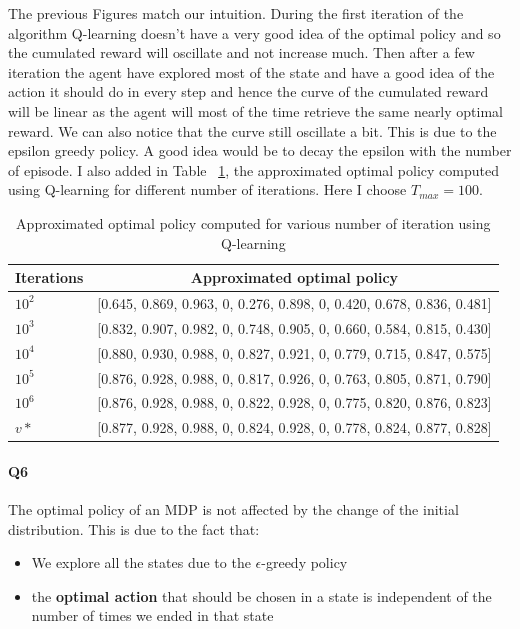 \documentclass[11pt]{article}
\numberwithin{figure}{section} %
\begin{document}
The previous Figures match our intuition. During the first iteration of the algorithm Q-learning doesn't have a very good idea of the optimal policy and so the cumulated reward will oscillate and not increase much. Then after a few iteration the agent have explored most of the state and have a good idea of the action it should do in every step and hence the curve of the cumulated reward will be linear as the agent will most of the time retrieve the same nearly optimal reward. We can also notice that the curve still oscillate a bit. This is due to the epsilon greedy policy. A good idea would be to decay the epsilon with the number of episode. I also added in Table ~\ref{table:Q_learning_table}, the approximated optimal policy computed using Q-learning for different number of iterations. Here I choose $T_{max} = 100$.

\begin{table}[H]
\centering
\begin{tabular}{|l|l|}
\toprule
\textbf{Iterations}  & \multicolumn{1}{c|}{\textbf{Approximated optimal policy}}                  \\ \midrule
$10^2$ & {[}0.645, 0.869, 0.963, 0, 0.276, 0.898, 0, 0.420, 0.678, 0.836, 0.481{]} \\
$10^3$ & {[}0.832, 0.907, 0.982, 0, 0.748, 0.905, 0, 0.660, 0.584, 0.815, 0.430{]} \\
$10^4$ & {[}0.880, 0.930, 0.988, 0, 0.827, 0.921, 0, 0.779, 0.715, 0.847, 0.575{]} \\
$10^5$ & {[}0.876, 0.928, 0.988, 0, 0.817, 0.926, 0, 0.763, 0.805, 0.871, 0.790{]} \\
$10^6$ & {[}0.876, 0.928, 0.988, 0, 0.822, 0.928, 0, 0.775, 0.820, 0.876, 0.823{]} \\ \midrule
$v*$                   & {[}0.877, 0.928, 0.988, 0, 0.824, 0.928, 0, 0.778, 0.824, 0.877, 0.828{]}  \\ \bottomrule
\end{tabular}
\caption{Approximated optimal policy computed for various number of iteration using Q-learning}
\label{table:Q_learning_table}
\end{table}

\paragraph{Q6} The optimal policy of an MDP is not affected by the change of the initial distribution. This is due to the fact that:
\begin{itemize}
\item We explore all the states due to the $\epsilon$-greedy policy
\item the \textbf{optimal action} that should be chosen in a state is independent of the number of times we ended in that state
\end{itemize}
\end{document}
